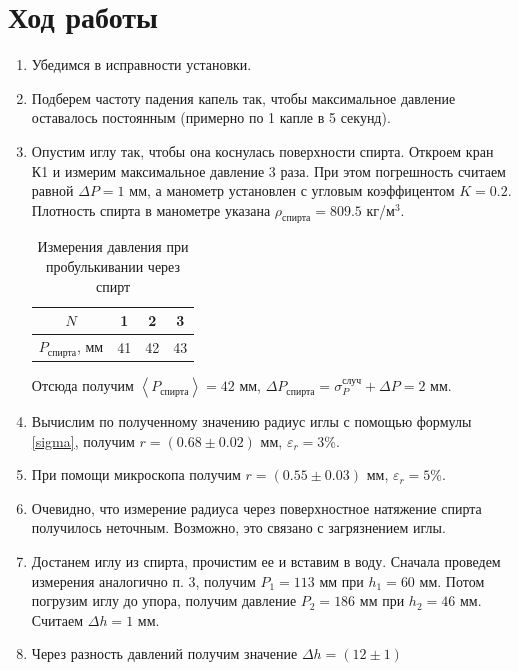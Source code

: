 \documentclass[12pt]{article}
\begin{document}
    \section{Ход работы}
    \begin{enumerate}
        \item Убедимся в исправности установки.
        \item Подберем частоту падения капель так, чтобы максимальное
        давление оставалось постоянным (примерно по 1 капле в 5 секунд).
        \item Опустим иглу так, чтобы она коснулась поверхности спирта.
        Откроем кран К1 и измерим максимальное давление 3 раза. При этом
        погрешность считаем равной $\Delta P = 1$ мм, а манометр установлен
        с угловым коэффицентом $K = 0.2$. Плотность спирта в манометре
        указана $\rho_{\text{спирта}} = 809.5$ кг/м$^3$.
        \begin{table}[H]
            \centering
            \begin{tabular}{|c|c|c|c|}
                \hline
                $N$ & 1 & 2 & 3 \\ \hline
                $P_{\text{спирта}}$, мм & 41 & 42 & 43 \\ \hline
            \end{tabular}
            \caption{Измерения давления при пробулькивании через спирт}
        \end{table}
        Отсюда получим $\left<P_{\text{спирта}}\right> = 42$ мм, $\Delta P_
        {\text{спирта}} = \sigma_P^{\text{случ}} + \Delta P = 2 $ мм.
        \item Вычислим по полученному значению радиус иглы с помощью
        формулы \ref{sigma}, получим $r = (0.68 \pm 0.02)$ мм,
        $\varepsilon_r = 3$\%.
        \item При помощи микроскопа получим $r = (0.55\pm 0.03)$ мм,
        $\varepsilon_r = 5$\%.
        \item Очевидно, что измерение радиуса через поверхностное натяжение
        спирта получилось неточным. Возможно, это связано с загрязнением
        иглы.
        \item Достанем иглу из спирта, прочистим ее и вставим в воду.
        Сначала проведем измерения аналогично п. 3, получим $P_1 =
        113$ мм при $h_1 = 60$ мм. Потом погрузим иглу до упора, получим
        давление $P_2 = 186$ мм при $h_2 = 46$ мм. Считаем $\Delta h = 1$ мм.
        \item Через разность давлений получим значение $\Delta h = (12 \pm 1)$

\end{enumerate}
\end{document}
